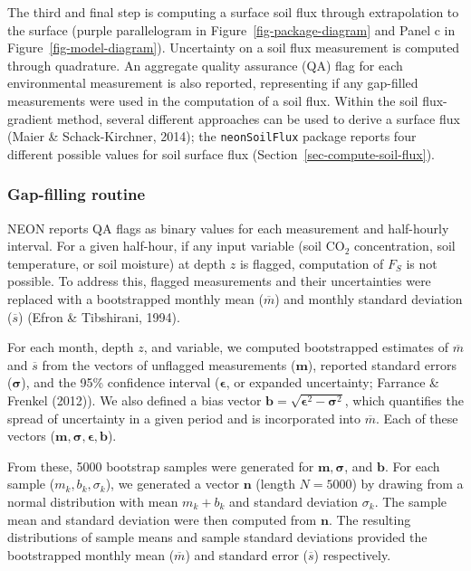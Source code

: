 \documentclass[
  letterpaper,
  DIV=11,
  numbers=noendperiod]{scrartcl}
\begin{document}
The third and final step is computing a surface soil flux through
extrapolation to the surface (purple parallelogram in
Figure~\ref{fig-package-diagram} and Panel c in
Figure~\ref{fig-model-diagram}). Uncertainty on a soil flux measurement
is computed through quadrature. An aggregate quality assurance (QA) flag
for each environmental measurement is also reported, representing if any
gap-filled measurements were used in the computation of a soil flux.
Within the soil flux-gradient method, several different approaches can
be used to derive a surface flux (Maier \& Schack-Kirchner, 2014); the
\texttt{neonSoilFlux} package reports four different possible values for
soil surface flux (Section~\ref{sec-compute-soil-flux}).

\subsubsection{Gap-filling routine}\label{sec-gapfilling}

NEON reports QA flags as binary values for each measurement and
half-hourly interval. For a given half-hour, if any input variable (soil
CO\(_2\) concentration, soil temperature, or soil moisture) at depth
\(z\) is flagged, computation of \(F_S\) is not possible. To address
this, flagged measurements and their uncertainties were replaced with a
bootstrapped monthly mean (\(\overline{m}\)) and monthly standard
deviation (\(\overline{s}\)) (Efron \& Tibshirani, 1994).

For each month, depth \(z\), and variable, we computed bootstrapped
estimates of \(\overline{m}\) and \(\overline{s}\) from the vectors of
unflagged measurements (\(\mathbf{m}\)), reported standard errors
(\(\boldsymbol\sigma\)), and the 95\% confidence interval
(\(\boldsymbol\epsilon\), or expanded uncertainty; Farrance \& Frenkel
(2012)). We also defined a bias vector
\(\mathbf{b}=\sqrt{\boldsymbol\epsilon^{2}-\boldsymbol\sigma^{2}}\),
which quantifies the spread of uncertainty in a given period and is
incorporated into \(\overline{m}\). Each of these vectors
(\(\mathbf{m}, \boldsymbol\sigma, \boldsymbol\epsilon, \mathbf{b}\)).

From these, 5000 bootstrap samples were generated for
\(\mathbf{m}, \boldsymbol\sigma\), and \(\mathbf{b}\). For each sample
(\(m_k, b_k, \sigma_k\)), we generated a vector \(\mathbf{n}\) (length
\(N=5000\)) by drawing from a normal distribution with mean \(m_k+b_k\)
and standard deviation \(\sigma_k\). The sample mean and standard
deviation were then computed from \(\mathbf{n}\). The resulting
distributions of sample means and sample standard deviations provided
the bootstrapped monthly mean (\(\overline{m}\)) and standard error
(\(\overline{s}\)) respectively.
\end{document}
